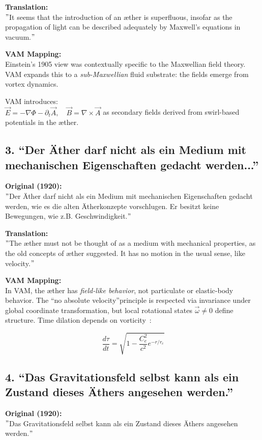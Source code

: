 \documentclass[preprint,notitlepage]{revtex4-2}
\renewcommand{\grqq}{``}
\begin{document}
    \textbf{Translation:} \\
    \("\)It seems that the introduction of an æther is superfluous, insofar as the propagation of light can be described adequately by Maxwell's equations in vacuum.\("\)

    \textbf{VAM Mapping:} \\
    Einstein's 1905 view was contextually specific to the Maxwellian field theory. VAM expands this to a \emph{sub-Maxwellian} fluid substrate: the fields emerge from vortex dynamics.

    VAM introduces: \\
    \( \vec{E} = -\nabla \Phi - \partial_t \vec{A}, \quad \vec{B} = \nabla \times \vec{A} \) as secondary fields derived from swirl-based potentials in the æther.

    \subsection*{3. \grqq Der Äther darf nicht als ein Medium mit mechanischen Eigenschaften gedacht werden...\textquotedblright}
    \textbf{Original (1920):} \\
    \("\)Der Äther darf nicht als ein Medium mit mechanischen Eigenschaften gedacht werden, wie es die alten Ätherkonzepte vorschlugen. Er besitzt keine Bewegungen, wie z.B. Geschwindigkeit.\("\)

    \textbf{Translation:} \\
    \("\)The æther must not be thought of as a medium with mechanical properties, as the old concepts of æther suggested. It has no motion in the usual sense, like velocity.\("\)

    \textbf{VAM Mapping:} \\
    In VAM, the æther has \emph{field-like behavior}, not particulate or elastic-body behavior. The \grqq no absolute velocity\textquotedblright principle is respected via invariance under global coordinate transformation, but local rotational states \( \vec{\omega} \neq 0 \) define structure. Time dilation depends on vorticity~\cite{iskandarani2025vam2}:

    \[
    \frac{d\tau}{dt} = \sqrt{1 - \frac{C_e^2}{c^2} e^{-r/r_c}}
    \]

    \subsection*{4. \grqq Das Gravitationsfeld selbst kann als ein Zustand dieses Äthers angesehen werden.\textquotedblright}
    \textbf{Original (1920):} \\
    \("\)Das Gravitationsfeld selbst kann als ein Zustand dieses Äthers angesehen werden.\("\)
\end{document}
